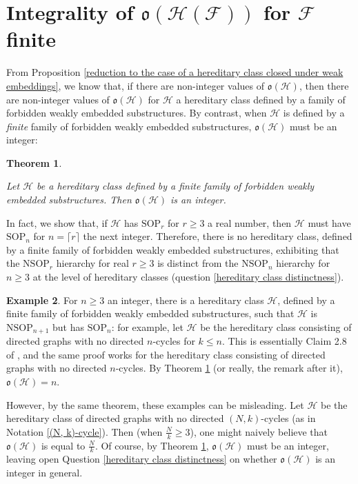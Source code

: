 \documentclass{amsart}
\newtheorem{theorem}{Theorem}[section]
\theoremstyle{definition}
\newtheorem{example}[theorem]{Example}
\theoremstyle{remark}
\numberwithin{equation}{section}
\begin{document}
\section{Integrality of $\mathfrak{o}(\mathcal{H}(\mathcal{F}))$ for $\mathcal{F}$ finite}

From Proposition \ref{reduction to the case of a hereditary class closed under weak embeddings}, we know that, if there are non-integer values of $\mathfrak{o}(\mathcal{H})$, then there are non-integer values of $\mathfrak{o}(\mathcal{H})$ for $\mathcal{H}$ a hereditary class defined by a family of forbidden weakly embedded substructures. By contrast, when $\mathcal{H}$ is defined by a \textit{finite} family of forbidden weakly embedded substructures, $\mathfrak{o}(\mathcal{H})$ must be an integer:

\begin{theorem} \label{integerality}

Let $\mathcal{H}$ be a hereditary class defined by a finite family of forbidden weakly embedded substructures. Then $\mathfrak{o}(\mathcal{H})$ is an integer.
\end{theorem}

In fact, we show that, if $\mathcal{H}$ has $\mathrm{SOP}_{r}$ for $r \geq 3$ a real number, then $\mathcal{H}$ must have $\mathrm{SOP}_{n}$ for $n = \lceil r \rceil $ the next integer. Therefore, there is no hereditary class, defined by a finite family of forbidden weakly embedded substructures, exhibiting that the $\mathrm{NSOP}_{r}$ hierarchy for real $r \geq 3$ is distinct from the $\mathrm{NSOP}_{n}$ hierarchy for $n \geq 3$ at the level of hereditary classes (question \ref{hereditary class distinctness}).

\begin{example}\label{examples of hereditary classes}
    For $n \geq 3$ an integer, there is a hereditary class $\mathcal{H}$, defined by a finite family of forbidden weakly embedded substructures, such that $\mathcal{H}$ is $\mathrm{NSOP}_{n+1}$ but has $\mathrm{SOP}_{n}$: for example, let $\mathcal{H}$ be the hereditary class consisting of directed graphs with no directed $n$-cycles for $k \leq n$. This is essentially Claim 2.8 of \cite{She95}, and the same proof works for the hereditary class consisting of directed graphs with no directed $n$-cycles. By Theorem \ref{integerality} (or really, the remark after it), $\mathfrak{o}(\mathcal{H}) = n$.

    However, by the same theorem, these examples can be misleading. Let $\mathcal{H}$ be the hereditary class of directed graphs with no directed $(N, k)$-cycles (as in Notation \ref{(N, k)-cycle}). Then (when $\frac{N}{k} \geq 3$), one might naively believe that $\mathfrak{o}(\mathcal{H})$ is equal to $\frac{N}{k}$. Of course, by Theorem \ref{integerality}, $\mathfrak{o}(\mathcal{H})$ must be an integer, leaving open Question \ref{hereditary class distinctness} on whether $\mathfrak{o}(\mathcal{H})$ is an integer in general.
\end{example}
\end{document}

